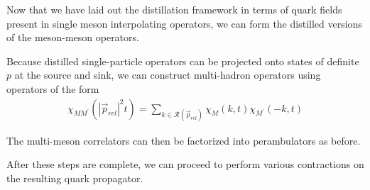 Now that we have laid out the distillation framework in terms of quark fields present in single meson interpolating operators, we can form the distilled versions of the meson-meson operators. 

Because distilled single-particle operators can be projected onto states of definite \(p\) at the source and sink, we can construct multi-hadron operators using operators of the form
\begin{align}
    \chi_{M M^\prime}(|\vec{p}_{rel}|^2 t) = \sum_{k\in\mathcal{R}(\vec{p}_{rel})}\chi_M(k, t) \chi_{M^\prime}(-k, t)
\end{align}

The multi-meson correlators can then be factorized into perambulators as before.

After these steps are complete, we can proceed to perform various contractions on the resulting quark propagator.
